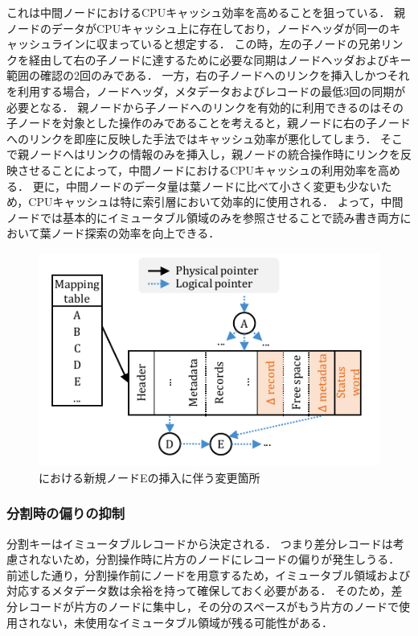 これは中間ノードにおけるCPUキャッシュ効率を高めることを狙っている．
親ノードのデータがCPUキャッシュ上に存在しており，ノードヘッダが同一のキャッシュラインに収まっていると想定する．
この時，左の子ノードの兄弟リンクを経由して右の子ノードに達するために必要な同期はノードヘッダおよびキー範囲の確認の2回のみである．
一方，右の子ノードへのリンクを挿入しかつそれを利用する場合，ノードヘッダ，メタデータおよびレコードの最低3回の同期が必要となる．
親ノードから子ノードへのリンクを有効的に利用できるのはその子ノードを対象とした操作のみであることを考えると，親ノードに右の子ノードへのリンクを即座に反映した手法ではキャッシュ効率が悪化してしまう．
そこで親ノードへはリンクの情報のみを挿入し，親ノードの統合操作時にリンクを反映させることによって，中間ノードにおけるCPUキャッシュの利用効率を高める．
更に，中間ノードのデータ量は葉ノードに比べて小さく変更も少ないため，CPUキャッシュは特に索引層において効率的に使用される．
よって，中間ノードでは基本的にイミュータブル領域のみを参照させることで読み書き両方において葉ノード探索の効率を向上できる．

\begin{figure}[t]
    \centering
    \includegraphics{./figures/Bc-inner_nodes.pdf}
    \caption{\Bctree{}における新規ノードEの挿入に伴う変更箇所}
    \label{fig:bc_tree_inner_nodes}
\end{figure}

\subsubsection{分割時の偏りの抑制}

分割キーはイミュータブルレコードから決定される．
つまり差分レコードは考慮されないため，分割操作時に片方のノードにレコードの偏りが発生しうる．
前述した通り，分割操作前にノードを用意するため，イミュータブル領域および対応するメタデータ数は余裕を持って確保しておく必要がある．
そのため，差分レコードが片方のノードに集中し，その分のスペースがもう片方のノードで使用されない，未使用なイミュータブル領域が残る可能性がある．

